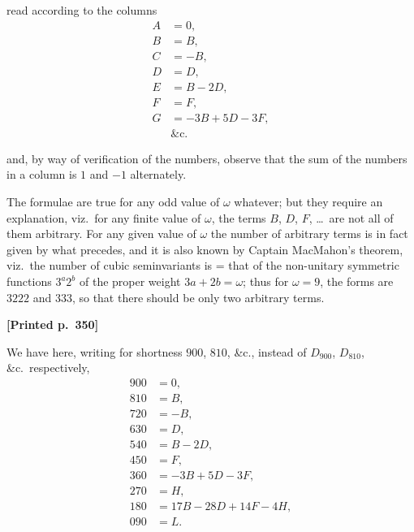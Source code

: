 \documentclass[11pt]{article}
\begin{document}
\medskip

\noindent read according to the columns
\begin{align*}
A &= 0, \\
B &= B, \\
C &= -B, \\
D &= D, \\
E &= B - 2D, \\
F &= F, \\
G &= -3B + 5D - 3F, \\
&\text{\&c.}
\end{align*}

\medskip

\noindent and, by way of verification of the numbers, observe that the sum of the numbers in a column is $1$ and $-1$ alternately.

The formulae are true for any odd value of $\omega$ whatever; but they require an explanation, viz.\ for any finite value of $\omega$, the terms $B$, $D$, $F$, \dots\ are not all of them arbitrary. For any given value of $\omega$ the number of arbitrary terms is in fact given by what precedes, and it is also known by Captain MacMahon's theorem, viz.\ the number of cubic seminvariants is = that of the non-unitary symmetric functions $3^{a}2^{b}$ of the proper weight $3a + 2b = \omega$; thus for $\omega = 9$, the forms are $3222$ and $333$, so that there should be only two arbitrary terms.

\medskip

\noindent\textbf{[Printed p.~350]}\hfill

We have here, writing for shortness $900$, $810$, \&c., instead of $D_{900}$, $D_{810}$, \&c.\ respectively,
\begin{align*}
900 &= 0, \\
810 &= B, \\
720 &= -B, \\
630 &= D, \\
540 &= B - 2D, \\
450 &= F, \\
360 &= -3B + 5D - 3F, \\
270 &= H, \\
180 &= 17B - 28D + 14F - 4H, \\
090 &= L.
\end{align*}
\end{document}
